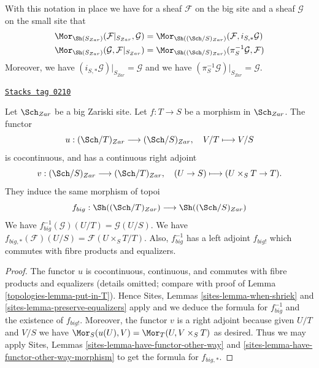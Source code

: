 With this notation in place we have for a sheaf $\mathcal{F}$ on the
big site and a sheaf $\mathcal{G}$ on the small site that
\begin{align*}
\Mor_{\Sh(S_{Zar})}(\mathcal{F}|_{S_{Zar}}, \mathcal{G})
& =
\Mor_{\Sh((\Sch/S)_{Zar})}(\mathcal{F},
i_{S, *}\mathcal{G}) \\
\Mor_{\Sh(S_{Zar})}(\mathcal{G}, \mathcal{F}|_{S_{Zar}})
& =
\Mor_{\Sh((\Sch/S)_{Zar})}(\pi_S^{-1}\mathcal{G},
\mathcal{F})
\end{align*}
Moreover, we have $(i_{S, *}\mathcal{G})|_{S_{Zar}} = \mathcal{G}$
and we have $(\pi_S^{-1}\mathcal{G})|_{S_{Zar}} = \mathcal{G}$.

\begin{lemma}
\label{topologies-lemma-morphism-big}
\href{https://stacks.math.columbia.edu/tag/0210}{\texttt{Stacks tag 0210}}

Let $\Sch_{Zar}$ be a big Zariski site.
Let $f : T \to S$ be a morphism in $\Sch_{Zar}$.
The functor
$$
u : (\Sch/T)_{Zar} \longrightarrow (\Sch/S)_{Zar},
\quad
V/T \longmapsto V/S
$$
is cocontinuous, and has a continuous right adjoint
$$
v : (\Sch/S)_{Zar} \longrightarrow (\Sch/T)_{Zar},
\quad
(U \to S) \longmapsto (U \times_S T \to T).
$$
They induce the same morphism of topoi
$$
f_{big} :
\Sh((\Sch/T)_{Zar})
\longrightarrow
\Sh((\Sch/S)_{Zar})
$$
We have $f_{big}^{-1}(\mathcal{G})(U/T) = \mathcal{G}(U/S)$.
We have $f_{big, *}(\mathcal{F})(U/S) = \mathcal{F}(U \times_S T/T)$.
Also, $f_{big}^{-1}$ has a left adjoint $f_{big!}$ which commutes with
fibre products and equalizers.
\end{lemma}

\begin{proof}

The functor $u$ is cocontinuous, continuous, and commutes with fibre products
and equalizers (details omitted; compare with proof of
Lemma \ref{topologies-lemma-put-in-T}).
Hence
Sites, Lemmas \ref{sites-lemma-when-shriek} and
\ref{sites-lemma-preserve-equalizers}
apply and we deduce the formula
for $f_{big}^{-1}$ and the existence of $f_{big!}$. Moreover,
the functor $v$ is a right adjoint because given $U/T$ and $V/S$
we have $\Mor_S(u(U), V) = \Mor_T(U, V \times_S T)$
as desired. Thus we may apply
Sites, Lemmas \ref{sites-lemma-have-functor-other-way} and
\ref{sites-lemma-have-functor-other-way-morphism}
to get the formula for $f_{big, *}$.
\end{proof}

